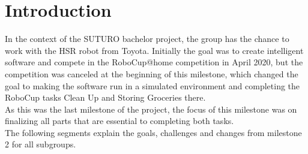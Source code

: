 \documentclass[main.tex]{subfiles}
\begin{document}
	
	\chapter{Introduction}

In the context of the SUTURO bachelor project, the group has the chance to work with the HSR robot from Toyota. Initially the goal was to create intelligent software and compete in the RoboCup@home competition in April 2020, but the competition was canceled at the beginning of this milestone, which changed the goal to making the software run in a simulated environment and completing the RoboCup tasks Clean Up and Storing Groceries there.\\
As this was the last milestone of the project, the focus of this milestone was on finalizing all parts that are essential to completing both tasks.\\
The following segments explain the goals, challenges and changes from milestone 2 for all subgroups.
	
\end{document}
